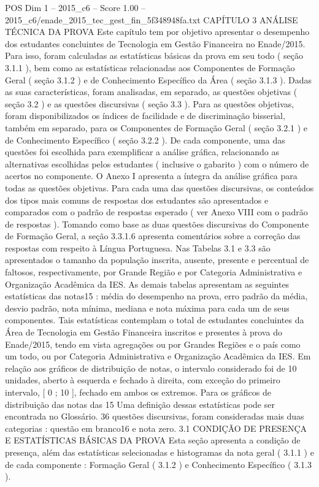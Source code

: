 \begin{textsample}{POS Dim 1 – 2015\_c6 – Score 1.00 – 2015\_c6/enade\_2015\_tec\_gest\_fin\_5f348948fa.txt}  \label{ex:f1_pos_158}
CAPÍTULO 3 ANÁLISE TÉCNICA DA PROVA Este capítulo tem por objetivo apresentar o desempenho dos estudantes concluintes de Tecnologia em Gestão Financeira no Enade/2015.
Para isso, foram calculadas as estatísticas básicas da prova em seu todo ( seção 3.1.1 ), bem como as estatísticas relacionadas aos Componentes de Formação Geral ( seção 3.1.2 ) e de Conhecimento Específico da Área ( seção 3.1.3 ).
Dadas as suas características, foram analisadas, em separado, as questões objetivas ( seção 3.2 ) e as questões discursivas ( seção 3.3 ).
Para as questões objetivas, foram disponibilizados os índices de facilidade e de discriminação bisserial, também em separado, para os Componentes de Formação Geral ( seção 3.2.1 ) e de Conhecimento Específico ( seção 3.2.2 ).
De cada componente, uma das questões foi escolhida para exemplificar a análise gráfica, relacionando as alternativas escolhidas pelos estudantes ( inclusive o gabarito ) com o número de acertos no componente.
O Anexo I apresenta a íntegra da análise gráfica para todas as questões objetivas.
Para cada uma das questões discursivas, os conteúdos dos tipos mais comuns de respostas dos estudantes são apresentados e comparados com o padrão de respostas esperado ( ver Anexo VIII com o padrão de respostas ).
Tomando como base as duas questões discursivas do Componente de Formação Geral, a seção 3.3.1.6 apresenta comentários sobre a correção das respostas com respeito à Língua Portuguesa.
Nas Tabelas 3.1 e 3.3 são apresentados o tamanho da população inscrita, ausente, presente e percentual de faltosos, respectivamente, por Grande Região e por Categoria Administrativa e Organização Acadêmica da IES.
As demais tabelas apresentam as seguintes estatísticas das notas15 : média do desempenho na prova, erro padrão da média, desvio padrão, nota mínima, mediana e nota máxima para cada um de seus componentes.
Tais estatísticas contemplam o total de estudantes concluintes da Área de Tecnologia em Gestão Financeira inscritos e presentes à prova do Enade/2015, tendo em vista agregações ou por Grandes Regiões e o país como um todo, ou por Categoria Administrativa e Organização Acadêmica da IES.
Em relação aos gráficos de distribuição de notas, o intervalo considerado foi de 10 unidades, aberto à esquerda e fechado à direita, com exceção do primeiro intervalo, [ 0 ; 10 ], fechado em ambos os extremos.
Para os gráficos de distribuição das notas das 15 Uma definição dessas estatísticas pode ser encontrada no Glossário. 36 questões discursivas, foram consideradas mais duas categorias : questão em branco16 e nota zero. 3.1 CONDIÇÃO DE PRESENÇA E ESTATÍSTICAS BÁSICAS DA PROVA Esta seção apresenta a condição de presença, além das estatísticas selecionadas e histogramas da nota geral ( 3.1.1 ) e de cada componente : Formação Geral ( 3.1.2 ) e Conhecimento Específico ( 3.1.3 ).

\end{textsample}

